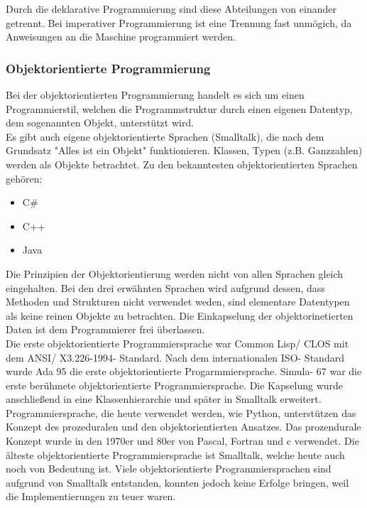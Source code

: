 \documentclass[12pt,a4paper]{report}
\begin{document}
Durch die deklarative Programmierung sind diese Abteilungen von einander getrennt. Bei imperativer Programmierung ist eine Trennung fast unmögich, da Anweisungen an die Maschine programmiert werden.

\subsubsection{Objektorientierte Programmierung}
Bei der objektorientierten Programmierung handelt es sich um einen Programmierstil, welchen die Programmstruktur durch einen eigenen Datentyp, dem sogenannten Objekt, unterstützt wird.\\

Es gibt auch eigene objektorientierte Sprachen (Smalltalk), die nach dem Grundsatz "{}Alles ist ein Objekt"{} funktionieren. Klassen, Typen (z.B. Ganzzahlen) werden als Objekte betrachtet. Zu den bekanntesten objektorientierten Sprachen gehören:
\begin{itemize}
\item C\#
\item C++
\item Java
\end{itemize}
Die Prinzipien der Objektorientierung werden nicht von allen Sprachen gleich eingehalten. Bei den drei erwähnten Sprachen wird aufgrund dessen, dass Methoden und Strukturen nicht verwendet weden, sind elementare Datentypen als keine reinen Objekte zu betrachten. Die Einkapselung der objektorinetierten Daten ist dem Programmierer frei überlassen.\\

Die erste objektorientierte Programmiersprache war Common Lisp/ CLOS mit dem ANSI/ X3.226-1994- Standard. Nach dem internationalen ISO- Standard wurde Ada 95 die erste objektorientierte Progarmmiersprache.
Simula- 67 war die erste berühmete objektorientierte Programmiersprache. Die Kapselung wurde anschließend in eine Klassenhierarchie und später in Smalltalk erweitert.\\

Programmiersprache, die heute verwendet werden, wie Python, unterstützen das Konzept des prozeduralen und den objektorientierten Ansatzes. Das prozendurale Konzept wurde in den 1970er und 80er von Pascal, Fortran und c verwendet. Die älteste objektorientierte Programmiersprache ist Smalltalk, welche heute auch noch von Bedeutung ist. Viele objektorientierte Programmiersprachen sind aufgrund von Smalltalk entstanden, konnten jedoch keine Erfolge bringen, weil die Implementierungen zu teuer waren.\\
\end{document}
